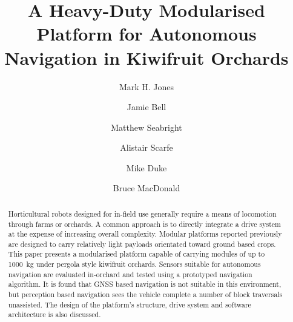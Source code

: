 \documentclass[preprint,authoryear,12pt]{elsarticle}
\begin{document}
\begin{frontmatter}



\title{A Heavy-Duty Modularised Platform for Autonomous Navigation in Kiwifruit Orchards}



\author[UoW]{Mark H. Jones}

\author[UoA]{Jamie Bell}
\author[UoW]{Matthew Seabright}
\author[RPL]{Alistair Scarfe}
\author[UoW]{Mike Duke}
\author[UoA]{Bruce MacDonald}

\address[UoW]{School of Engineering, University of Waikato, Hamilton, New Zealand}
\address[UoA]{Faculty of Engineering, University of Auckland, Auckland, New Zealand}
\address[RPL]{Robotics Plus Ltd, Newnham Innovation Park, Tauranga, New Zealand}


\begin{abstract}
    Horticultural robots designed for in-field use generally require a means of locomotion through farms or orchards.
    A common approach is to directly integrate a drive system at the expense of increasing overall complexity.
    Modular platforms reported previously are designed to carry relatively light payloads orientated toward ground based crops.
    This paper presents a modularised platform capable of carrying modules of up to \SI{1000}{\kilo\gram} under pergola style kiwifruit orchards.
    Sensors suitable for autonomous navigation are evaluated in-orchard and tested using a prototyped navigation algorithm.
    It is found that GNSS based navigation is not suitable in this environment, but perception based navigation sees the vehicle complete a number of block traversals unassisted.
    The design of the platform's structure, drive system and software architecture is also discussed.


\end{abstract}
\end{frontmatter}
\end{document}
